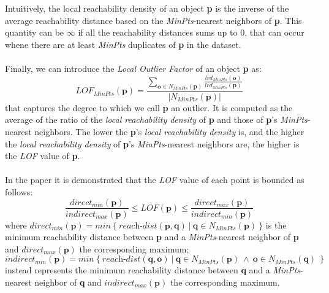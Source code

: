 Intuitively, the local reachability density of an object \textbf{p} is the inverse of the average reachability distance based on the \textit{MinPts}-nearest neighbors of \textbf{p}. This quantity can be $\infty$ if all the reachability distances sums up to 0, that can occur whene there are at least \textit{MinPts} duplicates of \textbf{p} in the dataset.

\paragraph{}
Finally, we can introduce the \textit{Local Outlier Factor} of an object \textbf{p} as:
\begin{equation}
    LOF_{MinPts}(\textbf{p}) = \frac
    {\displaystyle \sum\limits_{\textbf{o} \in N_{MinPts}(\textbf{p}) } 
        \frac{lrd_{MinPts}(\textbf{o})}{lrd_{MinPts}(\textbf{p})}
    }
    {|N_{MinPts}(\textbf{p})|}
\end{equation}
that captures the degree to which we call \textbf{p} an outlier. It is computed as the average of the ratio of the \textit{local reachability density} of \textbf{p} and those of \textbf{p}'s \textit{MinPts}-nearest neighbors. The lower the \textbf{p}'s \textit{local reachability density} is, and the higher the \textit{local reachability density} of \textbf{p}'s \textit{MinPts}-nearest neighbors are, the higher is the \textit{LOF} value of \textbf{p}.

\paragraph{}
In the paper it is demonstrated that the \textit{LOF} value of each point is bounded as follows:
\begin{equation}
    \frac{direct_{min}(\textbf{p})}{indirect_{max}(\textbf{p})}
    \leq
    LOF(\textbf{p})
    \leq
    \frac{direct_{max}(\textbf{p})}{indirect_{min}(\textbf{p})}
\end{equation}
where $direct_{min}(\textbf{p}) = min\ \{\ \textit{reach-dist}(\textbf{p}, \textbf{q})\ |\ \textbf{q} \in N_{MinPts}(\textbf{p})\ \}$ is the minimum reachability distance between \textbf{p} and a \textit{MinPts}-nearest neighbor of \textbf{p} and $direct_{max}(\textbf{p})$ the corresponding maximum; $indirect_{min}(\textbf{p}) = min\ \{\ \textit{reach-dist}(\textbf{q}, \textbf{o})\ |\ \textbf{q} \in N_{MinPts}(\textbf{p})\ \wedge\ \textbf{o} \in N_{MinPts}(\textbf{q})\ \ \}$ instead represents the minimum reachability distance between \textbf{q} and a \textit{MinPts}-nearest neighbor of \textbf{q} and $indirect_{max}(\textbf{p})$ the corresponding maximum.


